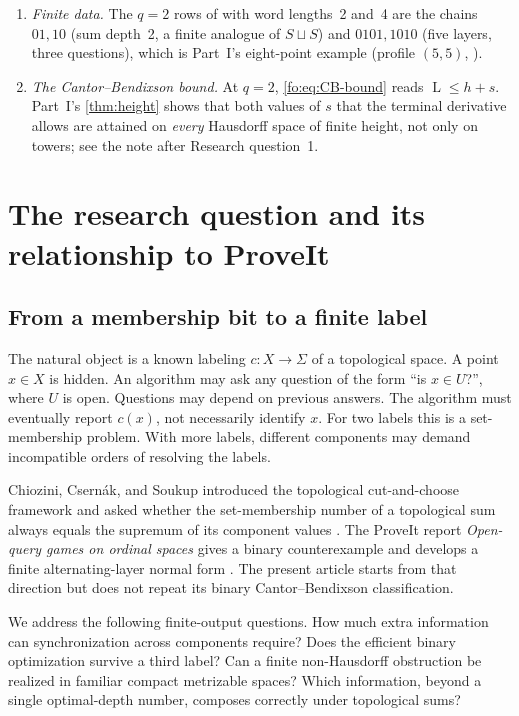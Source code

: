 \documentclass[11pt,letterpaper]{article}
\numberwithin{equation}{section}
\theoremstyle{definition}
\theoremstyle{remark}
\theoremstyle{definition}
\newcommand{\ceil}[1]{\left\lceil#1\right\rceil}
\newcommand{\layers}{\operatorname{L}}
\begin{document}
\begin{enumerate}
\cref{prop:profile-sum}; Part~I's \cref{thm:sharp} attains the extra question
for the supremum over targets, Part~II's families for fixed colorings. For
$q\ge3$ the exact overhead $\ceil{\log_2q}$ exceeds one
(\cref{fo:sec:three-colors}).
\item \emph{Finite data.} The $q=2$ rows of
 with word lengths~2 and~4
are the chains $01,10$ (sum depth~2, a finite analogue of $S\sqcup S$) and
$0101,1010$ (five layers, three questions), which is Part~I's eight-point
example (profile $(5,5)$, ).
\item \emph{The Cantor--Bendixson bound.} At $q=2$, \eqref{fo:eq:CB-bound}
reads $\layers\le h+s$. Part~I's \cref{thm:height} shows that both values of
$s$ that the terminal derivative allows are attained on \emph{every} Hausdorff
space of finite height, not only on towers; see the note after Research
question~1.
\end{enumerate}

\section{The research question and its relationship to ProveIt}
\label{fo:sec:scope}

\subsection{From a membership bit to a finite label}
The natural object is a known labeling $c:X\to\Sigma$ of a topological space.
A point $x\in X$ is hidden. An algorithm may ask any question of the form
``is $x\in U$?'', where $U$ is open. Questions may depend on previous answers.
The algorithm must eventually report $c(x)$, not necessarily identify $x$.
For two labels this is a set-membership problem. With more labels, different
components may demand incompatible orders of resolving the labels.

Chiozini, Csern\'ak, and Soukup introduced the topological cut-and-choose
framework and asked whether the set-membership number of a topological sum
always equals the supremum of its component values \cite{CCS}. The ProveIt
report \emph{Open-query games on ordinal spaces} gives a binary counterexample
and develops a finite alternating-layer normal form \cite{Repo}. The present
article starts from that direction but does not repeat its binary
Cantor--Bendixson classification.

We address the following finite-output questions. How much extra information
can synchronization across components require? Does the efficient binary
optimization survive a third label? Can a finite non-Hausdorff obstruction be
realized in familiar compact metrizable spaces? Which information, beyond a
single optimal-depth number, composes correctly under topological sums?
\end{document}
